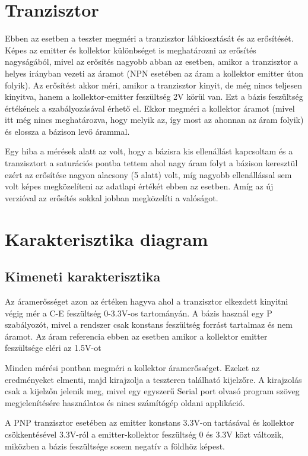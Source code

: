 \section{Tranzisztor}

Ebben az esetben a teszter megméri a tranzisztor lábkiosztását és az erősítését.
Képes az emitter és kollektor különbséget is meghatározni az erősítés nagyságából,
mivel az erősítés nagyobb abban az esetben, amikor a tranzisztor a helyes irányban
vezeti az áramot (NPN esetében az áram a kollektor emitter úton folyik).
Az erősítést akkor méri, amikor a tranzisztor kinyit, de még nincs teljesen kinyitva,
hanem a kollektor-emitter feszültség 2V körül van. Ezt a bázis feszültség
értékének a szabályozásával érhető el. Ekkor megméri a kollektor áramot
(mivel itt még nincs meghatározva, hogy melyik az, így most az ahonnan
az áram folyik) és elossza a bázison levő árammal.

Egy hiba a mérések alatt az volt, hogy a bázisra kis ellenállást
kapcsoltam és a tranzisztort a saturációs pontba tettem ahol 
nagy áram folyt a bázison keresztül ezért az erősítése nagyon alacsony
(5 alatt) volt, míg nagyobb ellenállással sem volt képes megközelíteni
az adatlapi értékét ebben az esetben. Amíg az új verzióval az 
erősítés sokkal jobban megközelíti a valóságot.

\section{Karakterisztika diagram}


\subsection{Kimeneti karakterisztika}

Az áramerősséget azon az értéken hagyva ahol a tranzisztor elkezdett kinyitni
végig mér a C-E feszültség 0-3.3V-os tartományán. A bázis használ egy 
P szabályozót, mivel a rendszer csak konstans feszültség forrást tartalmaz
és nem áramot. Az áram referencia ebben az esetben amikor a kollektor
emitter feszültsége eléri az 1.5V-ot

Minden mérési pontban megméri a kollektor
áramerősséget. Ezeket az eredményeket elmenti, majd kirajzolja a 
teszteren található kijelzőre. A kirajzolás csak a kijelzőn
jelenik meg, mivel egy egyszerű Serial port olvasó program
szöveg megjelenítésére használatos és nincs számítógép oldani applikáció.

A PNP tranzisztor esetében az emitter konstans 3.3V-on tartásával és 
kollektor csökkentésével 3.3V-ról a emitter-kollektor feszültség
0 és 3.3V közt változik, miközben a bázis feszültsége sosem negatív
a földhöz képest.

